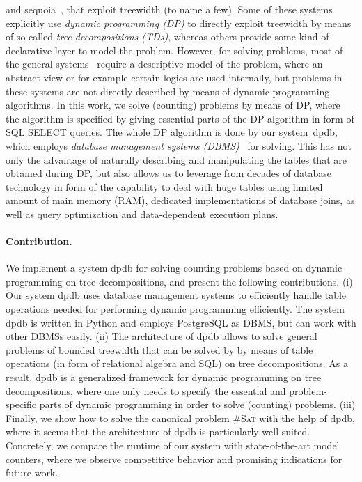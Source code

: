 \documentclass{llncs}
\newcommand{\cSAT}{\textsc{\#Sat}\xspace}%
\newcommand{\dpdb}{{\small\textsf{dpdb}}\xspace}
\begin{document}
and sequoia~\cite{LangerEtAl12}, that exploit treewidth (to name a few).
%
Some of these systems explicitly use \emph{dynamic programming (DP)} 
to directly exploit treewidth
by means of so-called \emph{tree decompositions (TDs)},
whereas others provide some kind of declarative layer to model
the problem.
%
However, for solving problems, most of the general systems~\cite{BannachBerndt19,LangerEtAl12}
require a descriptive model of the problem, 
where an abstract view or for example certain logics are used internally,
but problems in these systems are not directly described by means of 
dynamic programming algorithms.
%
In this work, we solve (counting) problems by means of DP,
where the algorithm is specified by giving essential parts of the 
DP algorithm in form of SQL {\ttfamily SELECT} queries.
The whole DP algorithm is done by our system~\dpdb,
which employs \emph{database management systems (DBMS)}~\cite{Ullman89} for solving.
%
This has not only the advantage of naturally describing and manipulating the tables
that are obtained during DP, but also allows us to leverage from decades of
database technology in form of the capability to deal with huge tables
using limited amount of main memory (RAM),
dedicated implementations of database joins, as well as
query optimization and data-dependent execution plans.

%
%
%
%
\paragraph{Contribution.}  
We implement a system \dpdb for solving counting problems based on dynamic programming on tree decompositions,
and present the following contributions.
(i) Our system \dpdb uses database management systems to efficiently handle table operations needed
for performing dynamic programming efficiently. The system \dpdb is written in Python and employs PostgreSQL as DBMS,
but can work with other DBMSs easily.
(ii) The architecture of \dpdb allows to solve general problems of bounded treewidth that can be solved by
by means of table operations (in form of relational algebra and SQL) on tree decompositions. As a result, \dpdb is a generalized framework 
for dynamic programming on tree decompositions, where one only needs to specify the essential and problem-specific parts of dynamic programming
in order to solve (counting) problems.
(iii) Finally, we show how to solve the canonical problem \cSAT with the help of \dpdb, 
where it seems that the architecture of \dpdb
is particularly well-suited. Concretely, we compare the runtime of
our system with state-of-the-art model counters, where we observe competitive behavior
and promising indications for future work.
%
\end{document}
